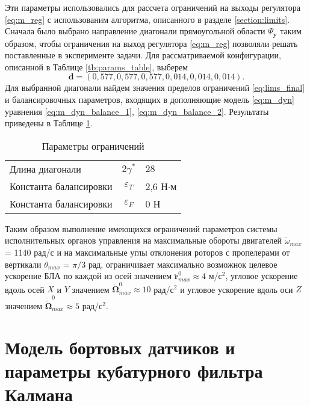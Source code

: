 Эти параметры использовались для рассчета ограничений на выходы регулятора \eqref{eq:m_reg} с использованим алгоритма, описанного в разделе \ref{section:limits}. Сначала было выбрано направление диагонали прямоугольной области $\Psi_{\boldsymbol{y}}$ таким образом, чтобы ограничения на выход регулятора \eqref{eq:m_reg} позволяли решать поставленные в эксперименте задачи. 
Для рассматриваемой конфигурации, описанной в Таблице \ref{tb:params_table}, выберем
$$\bm d = (0,577, 0,577, 0,577, 0,014, 0,014, 0,014).$$
Для выбранной диагонали найдем значения пределов ограничений \eqref{eq:lims_final} и балансировочных параметров, входящих в дополняющие модель \eqref{eq:m_dyn} уравнения \ref{eq:m_dyn_balance_1}, \ref{eq:m_dyn_balance_2}. Результаты приведены в Таблице \ref{tb:lims_table}.
\begin{table}[h!]
	\centering
	\caption{Параметры ограничений}\label{tb:lims_table} 
	\begin{tabular}{lcl}
		\hline	
		Длина диагонали & $2\gamma^*$ & $28$ \\
		Константа балансировки & $\varepsilon_T$ &2,6 Н$\cdot$м \\
		Константа балансировки & $\varepsilon_F$ &0 Н\\
		\hline
	\end{tabular}
\end{table}
Таким образом выполнение имеющихся ограничений параметров системы исполнительных органов управления на максимальные обороты двигателей
$\tilde \omega_{max}$ = 1140 рад/с
и на максимальные углы отклонения роторов с пропелерами от вертикали
$\theta_{max}$ = ${\pi}/{3}$ рад,
ограничивает максимально возможнок целевое ускорение БЛА по каждой из осей значением
$\ddot {\bm r}_{max}^0 \approx 4$ м/с$^2$,
угловое ускорение вдоль осей $X$ и $Y$ значением
$\dot {\bm \Omega}_{max}^0 \approx 10$ рад/с$^2$
и угловое ускорение вдоль оси $Z$ значением
$\dot {\tilde{\bm \Omega}}_{max}^0 \approx 5$ рад/с$^2$.

\section{Модель бортовых датчиков и параметры кубатурного фильтра Калмана}

